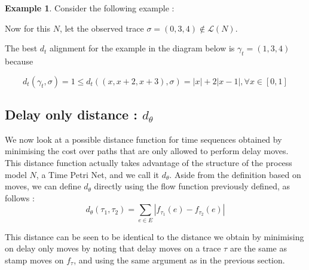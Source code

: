 \documentclass{article}
\theoremstyle{Definition}
\theoremstyle{definition}
\newtheorem{example}{Example}
\begin{document}
	\begin{example}\label{stamptoy}
		Consider the following example : 
		
		
		Now for this $N$, let the observed trace $\sigma = (0,3,4) \not \in \mathcal{L}(N)$. 
		
		The best $d_t$ alignment for the example in the diagram below is $\gamma_t = (1,3,4)$ because
		
		$$d_t(\gamma_t, \sigma) = 1 \leq d_t((x, x+2, x+3), \sigma) = |x| + 2|x-1|, \forall x \in [0, 1]$$
	\end{example}	
	
	
	\subsection{Delay only distance : $d_\theta$}
	
		We now look at a possible distance function for time sequences obtained by minimising the cost over paths that are only allowed to perform delay moves. 
		This distance function actually takes advantage of the structure of the process model $N$, a Time Petri Net, and we call it $d_\theta$. Aside from the definition based on moves, we can define $d_\theta$ directly using the flow function previously defined, as follows : 
	$$d_\theta(\tau_1, \tau_2) = \sum_{e \in E}|f_{\tau_1}(e) - f_{\tau_2}(e)|$$
	

This distance can be seen to be identical to the distance we obtain by minimising on delay only moves by noting that delay moves on a trace $\tau$ are the same as stamp moves on $f_\tau$, and using the same argument as in the previous section. 
\end{document}
